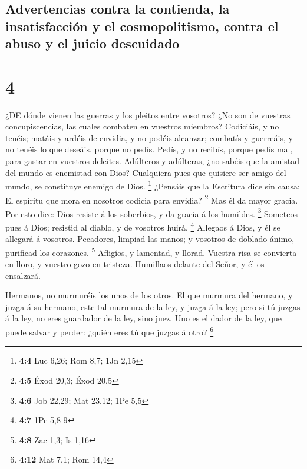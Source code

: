 \hypertarget{advertencias-contra-la-contienda-la-insatisfacciuxf3n-y-el-cosmopolitismo-contra-el-abuso-y-el-juicio-descuidado}{%
\subsection{Advertencias contra la contienda, la insatisfacción y el
cosmopolitismo, contra el abuso y el juicio
descuidado}\label{advertencias-contra-la-contienda-la-insatisfacciuxf3n-y-el-cosmopolitismo-contra-el-abuso-y-el-juicio-descuidado}}

\hypertarget{section-3}{%
\section{4}\label{section-3}}

 ¿DE dónde vienen las guerras y los pleitos entre vosotros?
¿No son de vuestras concupiscencias, las cuales combaten en vuestros
miembros?  Codiciáis, y no tenéis; matáis y ardéis de
envidia, y no podéis alcanzar; combatís y guerreáis, y no tenéis lo que
deseáis, porque no pedís.  Pedís, y no recibís, porque pedís
mal, para gastar en vuestros deleites.  Adúlteros y
adúlteras, ¿no sabéis que la amistad del mundo es enemistad con Dios?
Cualquiera pues que quisiere ser amigo del mundo, se constituye enemigo
de Dios. \footnote{\textbf{4:4} Luc 6,26; Rom 8,7; 1Jn 2,15}
 ¿Pensáis que la Escritura dice sin causa: El espíritu que
mora en nosotros codicia para envidia? \footnote{\textbf{4:5} Éxod 20,3;
  Éxod 20,5}  Mas él da mayor gracia. Por esto dice: Dios
resiste á los soberbios, y da gracia á los humildes. \footnote{\textbf{4:6}
  Job 22,29; Mat 23,12; 1Pe 5,5}  Someteos pues á Dios;
resistid al diablo, y de vosotros huirá. \footnote{\textbf{4:7} 1Pe
  5,8-9}  Allegaos á Dios, y él se allegará á vosotros.
Pecadores, limpiad las manos; y vosotros de doblado ánimo, purificad los
corazones. \footnote{\textbf{4:8} Zac 1,3; Is 1,16} 
Afligíos, y lamentad, y llorad. Vuestra risa se convierta en lloro, y
vuestro gozo en tristeza.  Humillaos delante del Señor, y
él os ensalzará.

 Hermanos, no murmuréis los unos de los otros. El que
murmura del hermano, y juzga á su hermano, este tal murmura de la ley, y
juzga á la ley; pero si tú juzgas á la ley, no eres guardador de la ley,
sino juez.  Uno es el dador de la ley, que puede salvar y
perder: ¿quién eres tú que juzgas á otro? \footnote{\textbf{4:12} Mat
  7,1; Rom 14,4}

